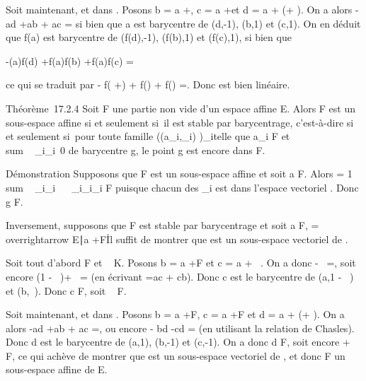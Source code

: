 \documentclass[]{article}
\begin{document}
Soit maintenant, \overrightarrow\xi et
\overrightarrow\eta dans
\overrightarrowE. Posons b = a
+\overrightarrow \xi, c = a
+\overrightarrow \eta et d = a +
(\overrightarrow\xi +\overrightarrow
\eta). On a alors -\overrightarrow ad
+\overrightarrow ab +\overrightarrow
ac = si bien que a est barycentre
de (d,-1), (b,1) et (c,1). On en déduit que f(a) est barycentre de
(f(d),-1), (f(b),1) et (f(c),1), si bien que

-\overrightarrowf(a)f(d)
+\overrightarrow f(a)f(b)
+\overrightarrow f(a)f(c)
=

ce qui se traduit par -\vec
f(\overrightarrow\xi
+\overrightarrow \eta) +\vec
f(\overrightarrow\xi) +\vec
f(\overrightarrow\eta)
=. Donc \vecf est
bien linéaire.

Théorème~17.2.4 Soit F une partie non vide d'un espace affine E. Alors F
est un sous-espace affine si et seulement si~il est stable par
barycentrage, c'est-à-dire si et seulement si~pour toute famille
\left ((a_i,\lambda_i)\right
)_i\inI telle que a_i \in F et
\\sum ~
_i\inI\lambda_i\neq~0 de barycentre g, le
point g est encore dans F.

Démonstration Supposons que F est un sous-espace affine et soit a \in F.
Alors \overrightarrowag = 1 \over
\\sum ~
_i\inI\lambda_i \
\sum ~
_i\inI\lambda_i\overrightarrowaa_i
\in\overrightarrow F puisque chacun des
\overrightarrowaa_i est dans l'espace
vectoriel \overrightarrowF. Donc g \in F.

Inversement, supposons que F est stable par barycentrage et soit a \in F,
\overrightarrowF =
\\overrightarrow\xi
\in\overrightarrow E∣a
+\overrightarrow \xi \in F\. Il suffit
de montrer que \overrightarrowF est un sous-espace
vectoriel de \overrightarrowE.

Soit tout d'abord \overrightarrow\xi
\in\overrightarrow F et \lambda~ \in K. Posons b = a
+\overrightarrow \xi \in F et c = a +
\lambda~\overrightarrow\xi. On a donc
\overrightarrowac -
\lambda~\overrightarrowab =, soit encore (1 - \lambda~)\overrightarrowac +
\lambda~\overrightarrowbc = (en écrivant \overrightarrowab
=\overrightarrow ac +\overrightarrow
cb). Donc c est le barycentre de (a,1 - \lambda~) et (b,\lambda~). Donc c \in F, soit
\lambda~\overrightarrow\xi \in\overrightarrow
F.

Soit maintenant, \overrightarrow\xi et
\overrightarrow\eta dans
\overrightarrowF. Posons b = a
+\overrightarrow \xi \in F, c = a
+\overrightarrow \eta \in F et d = a +
(\overrightarrow\xi +\overrightarrow
\eta). On a alors -\overrightarrow ad
+\overrightarrow ab +\overrightarrow
ac =, ou encore
\overrightarrowad -\overrightarrow
bd -\overrightarrow cd
= (en utilisant la relation de
Chasles). Donc d est le barycentre de (a,1), (b,-1) et (c,-1). On a donc
d \in F, soit encore \overrightarrow\xi
+\overrightarrow \eta \in{}, ce qui achève de montrer que \overrightarrowF
est un sous-espace vectoriel de \overrightarrowE, et
donc F un sous-espace affine de E.
\end{document}
